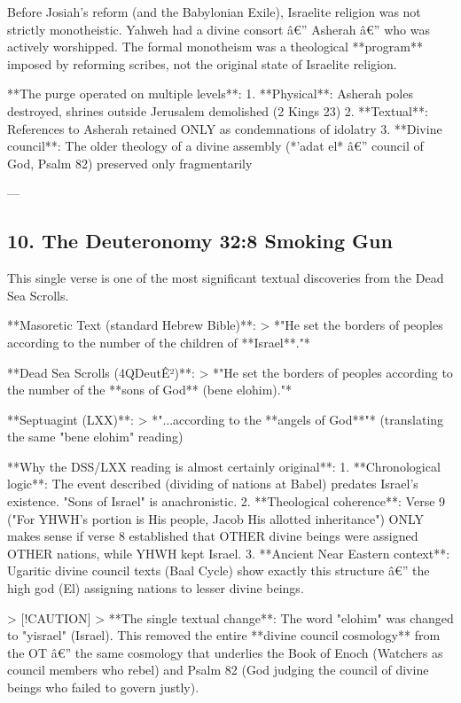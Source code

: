\documentclass[aps,prd,11pt,onecolumn,superscriptaddress,nofootinbib,floatfix]{revtex4-2}
\begin{document}
Before Josiah's reform (and the Babylonian Exile), Israelite religion was not strictly monotheistic. Yahweh had a divine consort â€'' Asherah â€'' who was actively worshipped. The formal monotheism was a theological **program** imposed by reforming scribes, not the original state of Israelite religion.


**The purge operated on multiple levels**:
1. **Physical**: Asherah poles destroyed, shrines outside Jerusalem demolished (2 Kings 23)
2. **Textual**: References to Asherah retained ONLY as condemnations of idolatry
3. **Divine council**: The older theology of a divine assembly (*'adat el* â€'' council of God, Psalm 82) preserved only fragmentarily


---


\subsection{10. The Deuteronomy 32:8 Smoking Gun}


This single verse is one of the most significant textual discoveries from the Dead Sea Scrolls.


**Masoretic Text (standard Hebrew Bible)**:
> *"He set the borders of peoples according to the number of the children of **Israel**."*


**Dead Sea Scrolls (4QDeutÊ²)**:
> *"He set the borders of peoples according to the number of the **sons of God** (bene elohim)."*


**Septuagint (LXX)**:
> *"...according to the **angels of God**"* (translating the same "bene elohim" reading)


**Why the DSS/LXX reading is almost certainly original**:
1. **Chronological logic**: The event described (dividing of nations at Babel) predates Israel's existence. "Sons of Israel" is anachronistic.
2. **Theological coherence**: Verse 9 ("For YHWH's portion is His people, Jacob His allotted inheritance") ONLY makes sense if verse 8 established that OTHER divine beings were assigned OTHER nations, while YHWH kept Israel.
3. **Ancient Near Eastern context**: Ugaritic divine council texts (Baal Cycle) show exactly this structure â€'' the high god (El) assigning nations to lesser divine beings.


> [!CAUTION]
> **The single textual change**: The word "elohim" was changed to "yisrael" (Israel). This removed the entire **divine council cosmology** from the OT â€'' the same cosmology that underlies the Book of Enoch (Watchers as council members who rebel) and Psalm 82 (God judging the council of divine beings who failed to govern justly).
\end{document}
